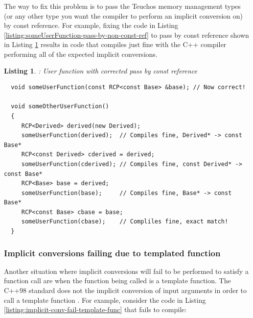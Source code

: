 \documentclass[pdf,ps2pdf,11pt]{SANDreport}
\newtheorem{listing}{Listing}
\begin{document}
The way to fix this problem is to pass the Teuchos memory management
types (or any other type you want the compiler to perform an implicit
conversion on) by const reference.  For example, fixing the code in
Listing {}\ref{listing:someUserFunction-pass-by-non-const-ref} to pass
by const reference shown in Listing
{}\ref{listing:someUserFunction-pass-by-const-ref} results in code
that compiles just fine with the C++ compiler performing all of the
expected implicit conversions.


{}\begin{listing}: User function with corrected pass by const
reference
\label{listing:someUserFunction-pass-by-const-ref}
{\small\begin{verbatim}
  void someUserFunction(const RCP<const Base> &base); // Now correct!

  void someOtherUserFunction()
  {
     RCP<Derived> derived(new Derived);
     someUserFunction(derived);  // Compiles fine, Derived* -> const Base*
     RCP<const Derived> cderived = derived;
     someUserFunction(cderived); // Compiles fine, const Derived* -> const Base*
     RCP<Base> base = derived;
     someUserFunction(base);     // Compiles fine, Base* -> const Base*
     RCP<const Base> cbase = base;
     someUserFunction(cbase);    // Compliles fine, exact match!
  }
\end{verbatim}}
\end{listing}


%
{}\subsubsection*{Implicit conversions failing due to templated function}
%

Another situation where implicit conversions will fail to be performed
to satisfy a function call are when the function being called is a
template function.  The C++98 standard does not the implicit
conversion of input arguments in order to call a template function
{}\cite[Item 45]{EffectiveC++ThirdEdition}.  For example, consider the
code in Listing {}\ref{listing:implicit-conv-fail-template-func} that
fails to compile:
\end{document}

